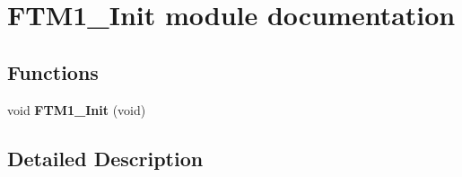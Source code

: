 \hypertarget{group___f_t_m1___init__module}{}\section{F\+T\+M1\+\_\+\+Init module documentation}
\label{group___f_t_m1___init__module}
\subsection*{Functions}
\begin{DoxyCompactItemize}
\item 
void {\bfseries F\+T\+M1\+\_\+\+Init} (void)\hypertarget{group___f_t_m1___init__module_ga43825685cd71929b1aefbdcba7c80bc4}{}\label{group___f_t_m1___init__module_ga43825685cd71929b1aefbdcba7c80bc4}

\end{DoxyCompactItemize}


\subsection{Detailed Description}
